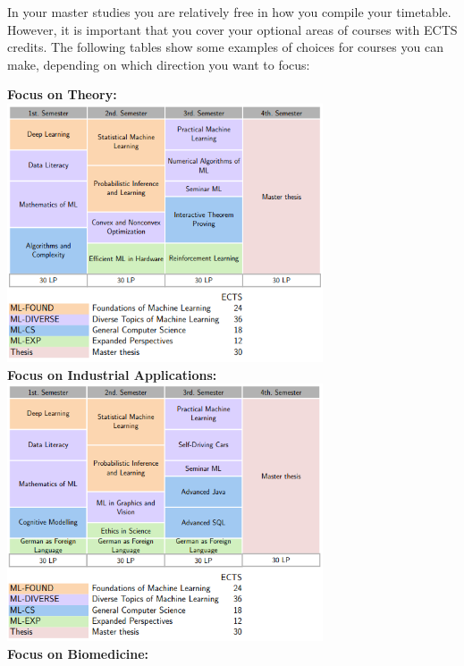 In your master studies you are relatively free in how you compile your timetable. However, it is important that you cover your optional areas of courses with ECTS credits. 
The following tables show some examples of choices for courses you can make, depending on which direction you want to focus:

\begin{center}
\textbf{Focus on Theory:} \\
\includegraphics[width=0.7\textwidth]{media/ML_Theorie}\\
\textbf{Focus on Industrial Applications:} \\
\includegraphics[width=0.7\textwidth]{media/ML_Praktisch}\\
\newpage
\textbf{Focus on Biomedicine:} \\

\end{center}
